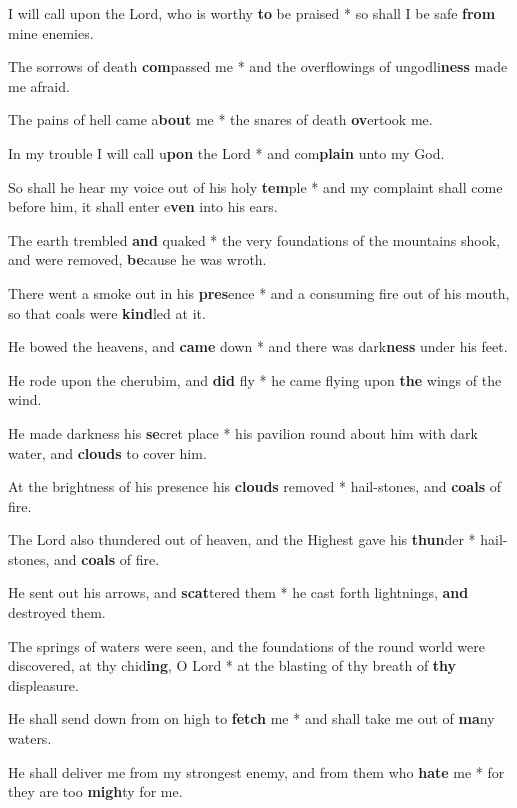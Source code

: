 \begin{multicols}{2}
	I will call upon the Lord, who is worthy \textbf{to} be praised * so shall I be safe \textbf{from} mine enemies.
	
	The sorrows of death \textbf{com}passed me * and the overflowings of ungodli\textbf{ness} made me afraid.
	
	The pains of hell came a\textbf{bout} me * the snares of death \textbf{ov}ertook me.
	
	In my trouble I will call u\textbf{pon} the Lord * and com\textbf{plain} unto my God.
	
	So shall he hear my voice out of his holy \textbf{tem}ple * and my complaint shall come before him, it shall enter e\textbf{ven} into his ears.
	
	The earth trembled \textbf{and} quaked * the very foundations of the mountains shook, and were removed, \textbf{be}cause he was wroth.
	
	There went a smoke out in his \textbf{pres}ence * and a consuming fire out of his mouth, so that coals were \textbf{kind}led at it.
	
	He bowed the heavens, and \textbf{came} down * and there was dark\textbf{ness} under his feet.
	
	He rode upon the cherubim, and \textbf{did} fly * he came flying upon \textbf{the} wings of the wind.
	
	He made darkness his \textbf{se}cret place * his pavilion round about him with dark water, and \textbf{clouds} to cover him.
	
	At the brightness of his presence his \textbf{clouds} removed * hail-stones, and \textbf{coals} of fire.
	
	The Lord also thundered out of heaven, and the Highest gave his \textbf{thun}der * hail-stones, and \textbf{coals} of fire.
	
	He sent out his arrows, and \textbf{scat}tered them * he cast forth lightnings, \textbf{and} destroyed them.
	
	The springs of waters were seen, and the foundations of the round world were discovered, at thy chid\textbf{ing}, O Lord * at the blasting of thy breath of \textbf{thy} displeasure.
	
	He shall send down from on high to \textbf{fetch} me * and shall take me out of \textbf{ma}ny waters.
	
	He shall deliver me from my strongest enemy, and from them who \textbf{hate} me * for they are too \textbf{migh}ty for me.
	

\end{multicols}
